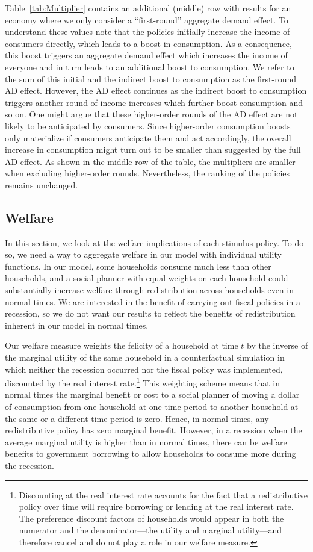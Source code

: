 \documentclass[qe,draft]{econsocart}
\theoremstyle{plain}
\theoremstyle{definition}
\begin{document}
Table~\ref{tab:Multiplier} contains an additional (middle) row with results for an economy where we only consider a ``first-round'' aggregate demand effect.
To understand these values note that the policies initially increase the income of consumers directly, which leads to a boost in consumption.
As a consequence, this boost triggers an aggregate demand effect which increases the income of everyone and in turn leads to an additional boost to consumption.
We refer to the sum of this initial and the indirect boost to consumption as the first-round AD effect.
However, the AD effect continues as the indirect boost to consumption triggers another round of income increases which further boost consumption and so on.
One might argue that these higher-order rounds of the AD effect are not likely to be anticipated by consumers.
Since higher-order consumption boosts only materialize if consumers anticipate them and act accordingly, the overall increase in consumption might turn out to be smaller than suggested by the full AD effect.
As shown in the middle row of the table, the multipliers are smaller when excluding higher-order rounds.
Nevertheless, the ranking of the policies remains unchanged.

\subsection{Welfare}
\label{sec:welfare} %

In this section, we look at the welfare implications of each stimulus policy.
To do so, we need a way to aggregate welfare in our model with individual utility functions.
In our model, some households consume much less than other households, and a social planner with equal weights on each household could substantially increase welfare through redistribution across households even in normal times.
We are interested in the benefit of carrying out fiscal policies in a recession, so we do not want our results to reflect the benefits of redistribution inherent in our model in normal times.

Our welfare measure weights the felicity of a household at time $t$ by the inverse of the marginal utility of the same household in a counterfactual simulation in which neither the recession occurred nor the fiscal policy was implemented, discounted by the real interest rate.\footnote{Discounting at the real interest rate accounts for the fact that a redistributive policy over time will require borrowing or lending at the real interest rate.
  The preference discount factors of households would appear in both the numerator and the denominator---the utility and marginal utility---and therefore cancel and do not play a role in our welfare measure.} This weighting scheme means that in normal times the marginal benefit or cost to a social planner of moving a dollar of consumption from one household at one time period to another household at the same or a different time period is zero.
Hence, in normal times, any redistributive policy has zero marginal benefit.
However, in a recession when the average marginal utility is higher than in normal times, there can be welfare benefits to government borrowing to allow households to consume more during the recession.
\end{document}
